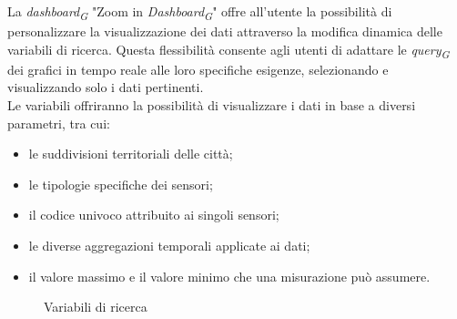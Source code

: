 La \textit{dashboard}\textsubscript{\textit{G}} "Zoom in \textit{Dashboard}\textsubscript{\textit{G}}" offre all'utente la possibilità di personalizzare la visualizzazione dei dati attraverso la modifica dinamica delle variabili di ricerca. Questa flessibilità consente agli utenti di adattare le \textit{query}\textsubscript{\textit{G}} dei grafici in tempo reale alle loro specifiche esigenze, selezionando e visualizzando solo i dati pertinenti.\\
Le variabili offriranno la possibilità di visualizzare i dati in base a diversi parametri, tra cui:
\begin{itemize}
    \item le suddivisioni territoriali delle città;
    \item le tipologie specifiche dei sensori;
    \item il codice univoco attribuito ai singoli sensori;
    \item le diverse aggregazioni temporali applicate ai dati;
    \item il valore massimo e il valore minimo che una misurazione può assumere.
\end{itemize}
\begin{figure}[H]
    \centering
    \caption{Variabili di ricerca}
    \label{fig:my_label}
\end{figure}



